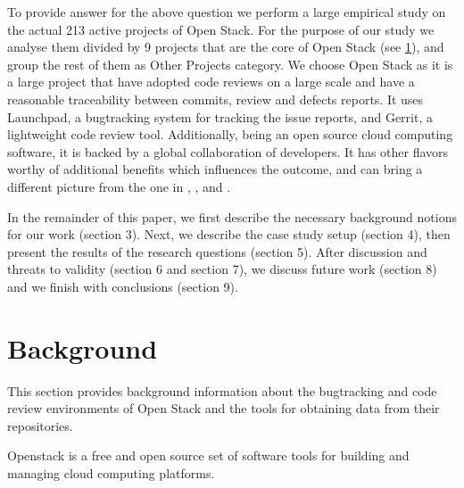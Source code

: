 \documentclass[ifip]{svmult}
\begin{document}
To provide answer for the above question we perform a large empirical study on the actual 213 active projects of Open Stack.
For the purpose of our study we analyse them divided by 9 projects that are the core of Open Stack (see \ref{sec:3}), and 
group the rest of them as Other Projects category.  
We choose Open Stack as it is a large project that have adopted code reviews on a large 
scale and have a reasonable traceability between commits, review and defects reports.
It uses Launchpad, a bugtracking system for tracking the issue reports, and Gerrit, a lightweight code review tool. Additionally, 
being an open source cloud computing software, it is backed by a global collaboration of developers. It has other flavors worthy of 
additional benefits which influences the outcome, and can bring a different picture from the one in \cite{contribution1}, 
\cite{contribution9}, \cite{contribution20} and \cite{contribution10}. 

In the remainder of this paper, we first describe the necessary background notions for our work (section 3). Next, we describe the 
case study setup (section 4), then present the results of the research questions (section 5). After discussion and threats to 
validity (section 6 and section 7), we discuss future work (section 8) and we finish with conclusions (section 9).

\section{Background}
\label{sec:3}

This section provides background information about the bugtracking and code review environments of Open Stack and the 
tools for obtaining data from their repositories.

Openstack is a free and open source set of software tools for building and managing cloud computing platforms. 


\end{document}
